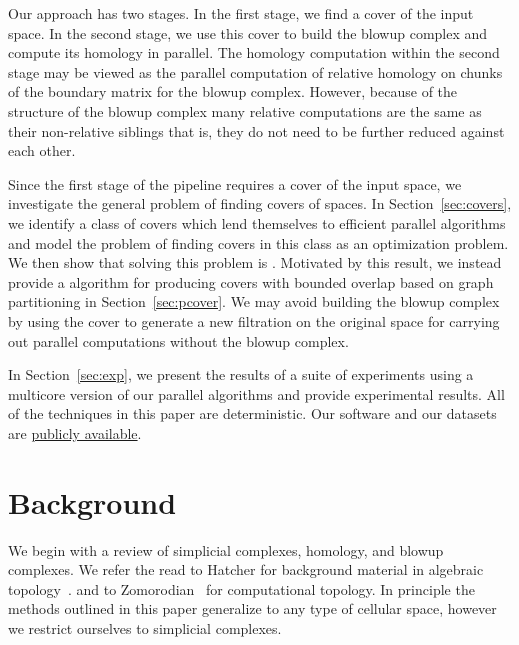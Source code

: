 \documentclass{elsarticle}
\begin{document}
Our approach has two stages. In the first stage, we find a cover of the input space. In the second stage, we 
use this cover to build the blowup complex and compute its homology in parallel. The homology computation within the second stage 
may be viewed as the parallel computation of relative homology on chunks of the boundary matrix for the blowup complex. However, 
because of the structure of the blowup complex many relative computations are the same as their non-relative siblings that is,
they do not need to be further reduced against each other.

Since the first stage of the pipeline requires a cover of the input space, we investigate the general problem of finding covers of spaces.
In Section~\ref{sec:covers}, we identify a class of covers which lend themselves to efficient parallel
algorithms and model the problem of finding covers in this class as an optimization problem. 
We then show that solving this problem is \NPH{}. Motivated by this result, we instead provide a 
algorithm for producing covers with bounded overlap based on graph partitioning in Section~\ref{sec:pcover}.  
We may avoid building the blowup complex by using the cover to generate a new filtration on the original space for 
carrying out parallel computations without the blowup complex.

In Section~\ref{sec:exp}, we present the results of a suite of experiments using a multicore version of our parallel algorithms and 
provide experimental results. All of the techniques in this paper are deterministic. Our software and our datasets are 
\href{http://ctl.appliedtopology.org}{publicly available}.

\section{Background}
We begin with a review of simplicial complexes, homology, and blowup complexes.
We refer the read to Hatcher for background material in algebraic topology~\cite{hatcher}.
and to Zomorodian~\cite[Chapter 13]{z-ct-10} for computational topology. 
In principle the methods outlined in this paper generalize to any type of cellular space, 
however we restrict ourselves to simplicial complexes. 
\end{document}
